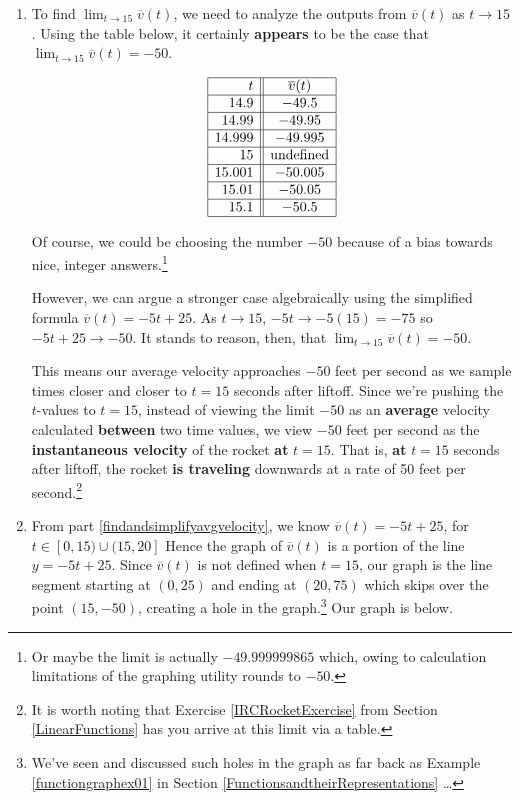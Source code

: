\documentclass{ximera}
\begin{document}
\begin{example}
\begin{explanation}
\begin{enumerate}
\item  To find $\lim_{t \rightarrow 15} \overline{v}(t)$, we need to analyze the outputs from $\overline{v}(t)$ as $t \rightarrow 15$. Using the table below, it certainly \textbf{appears} to be the case that $\lim_{t \rightarrow 15} \overline{v}(t) = -50$. 

\[\begin{array}{|r||c|}  \hline
  t & \overline{v}(t)  \\ \hline
 14.9 & -49.5  \\  \hline
14.99 & -49.95  \\  \hline 
14.999 & -49.995  \\  \hline 
15 & \text{undefined} \\  \hline 
15.001 & -50.005 \\  \hline
15.01 & -50.05 \\  \hline  
15.1 & -50.5 \\  \hline 
  \end{array}\] 

Of course, we could be choosing the number $-50$ because of a bias towards nice, integer answers.\footnote{Or maybe the limit is actually $-49.999999865$ which, owing to calculation limitations of the graphing utility rounds to $-50$.}

However, we can argue a stronger case algebraically using the simplified formula  $\overline{v}(t) = -5t+25$.   As $t \rightarrow15$,  $-5t \rightarrow -5(15) = -75$ so $-5t+25 \rightarrow -50$.  It stands to reason, then, that $\lim_{t \rightarrow 15} \overline{v}(t) = -50$.

This means our average velocity approaches $-50$ feet per second as we sample times closer and closer to $t = 15$ seconds after liftoff.  Since we're pushing the $t$-values to $t=15$, instead of viewing the limit $-50$ as an  \textbf{average} velocity calculated \textbf{between} two time values,  we view $-50$ feet per second as the  \textbf{instantaneous velocity} of the rocket \textbf{at} $t = 15$.   That is, \textbf{at} $t = 15$ seconds after liftoff, the rocket \textbf{is traveling} downwards at a rate of 50 feet per second.\footnote{It is worth noting that  Exercise \ref{IRCRocketExercise} from Section \ref{LinearFunctions} has you arrive at this limit via a table.} 

\item    From part \ref{findandsimplifyavgvelocity}, we know $\overline{v}(t) = -5t+25$,  for $t \in [0, 15) \cup (15, 20]$  Hence the graph of  $\overline{v}(t)$ is a portion of the line $y=  -5t+25$.  Since $\overline{v}(t)$ is not defined when $t = 15$, our graph is the line segment starting at $(0, 25)$ and ending at $(20, 75)$ which skips over the point $(15, -50)$, creating a hole in the graph.\footnote{We've seen and discussed such holes in the graph as far back as Example \ref{functiongraphex01} in Section \ref{FunctionsandtheirRepresentations}  \ldots}   Our graph is below.


\end{enumerate}
\end{explanation}
\end{example}
\end{document}
